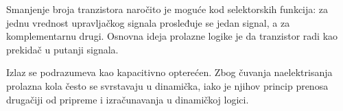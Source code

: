 Smanjenje broja tranzistora naročito je moguće kod selektorskih funkcija: za jednu vrednost upravljačkog signala prosleđuje se jedan signal, a za komplementarnu drugi. Osnovna ideja prolazne logike je da tranzistor radi kao prekidač u putanji signala.

Izlaz se podrazumeva kao kapacitivno opterećen. Zbog čuvanja naelektrisanja prolazna kola često se svrstavaju u dinamička, iako je njihov princip prenosa drugačiji od pripreme i izračunavanja u dinamičkoj logici.

